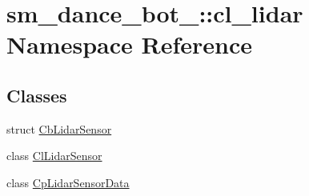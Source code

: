 \hypertarget{namespacesm__dance__bot__2_1_1cl__lidar}{}\section{sm\+\_\+dance\+\_\+bot\+\_\+:\+:cl\+\_\+lidar Namespace Reference}
\label{namespacesm__dance__bot__2_1_1cl__lidar}
\subsection*{Classes}
\begin{DoxyCompactItemize}
\item 
struct \hyperlink{structsm__dance__bot__2_1_1cl__lidar_1_1CbLidarSensor}{Cb\+Lidar\+Sensor}
\item 
class \hyperlink{classsm__dance__bot__2_1_1cl__lidar_1_1ClLidarSensor}{Cl\+Lidar\+Sensor}
\item 
class \hyperlink{classsm__dance__bot__2_1_1cl__lidar_1_1CpLidarSensorData}{Cp\+Lidar\+Sensor\+Data}
\end{DoxyCompactItemize}
